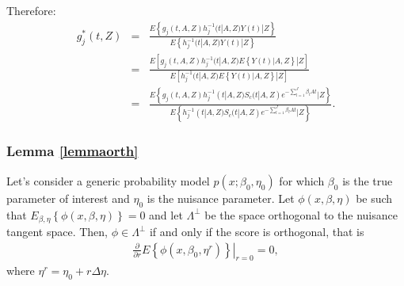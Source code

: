 \documentclass[11pt]{article}
\newcommand{\ee}{\end{eqnarray}}
\newcommand{\eqnn}{\begin{eqnarray*}}
\newcommand{\een}{\end{eqnarray*}}
\newcommand{\be}{\begin{eqnarray}}
\begin{document}
Therefore:
\eqnn
g^{*}_j(t, Z)&=&\frac{E\left\{g_j(t,A,Z)h_j^{-1}(t | A,Z)Y(t) | Z\right\}}{E\left\{h_j^{-1}(t | A,Z)Y(t) | Z\right\}}\\
&=&\frac{E\left[g_j(t,A,Z)h_j^{-1}(t | A,Z)E\left\{Y(t)| A,Z\right\} | Z\right]}{E\left[h_j^{-1}(t | A,Z)E\left\{Y(t)| A,Z\right\} | Z\right]}\\
&=&\frac{E\left\{g_j(t,A,Z)h_j^{-1}(t | A,Z)S_{c}(t | A,Z)  e^{-\sum_{l=1}^J\beta_{l}At} | Z\right\}}{E\left\{h_j^{-1}(t | A,Z)S_{c}(t | A,Z)  e^{-\sum_{l=1}^J\beta_{l}At} | Z\right\}}.
\een












\subsubsection{Lemma \ref{lemmaorth}} %

\begin{lemmas}\label{lemmaorth}
Let's consider a generic probability model $p(x ; \beta_0, \eta_0)$ for which $\beta_0$ is the true parameter of interest and $\eta_0$ is the nuisance parameter.
Let $\phi(x ,\beta, \eta)$ be such that $E_{\beta,\eta}\left\{\phi(x, \beta, \eta)\right\}=0$ and let $\Lambda^\perp$ be the space orthogonal to the nuisance tangent space.
Then, $\phi \in \Lambda^\perp$ if and only if the score is orthogonal, that is
\be
\frac{\partial}{\partial r} \left. E\left\{\phi(x, \beta_0, \eta^r)\right\}\right |_{r=0}=0,
\ee
where
$
 \eta^r=\eta_0+r\Delta \eta.
$
\end{lemmas}
\end{document}
